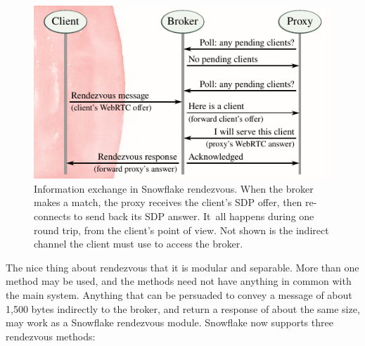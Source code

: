 \documentclass[letterpaper,twocolumn]{article}
\begin{document}
\begin{figure}
\includegraphics{figures/rendezvous/rendezvous}
\caption{
Information exchange in Snowflake rendezvous.
When the broker makes a match,
the proxy receives the client's SDP offer,
then re-connects to send back its SDP answer.
It~all happens during one round trip,
from the client's point of view.
Not shown is the indirect channel
the client must use to access the broker.
}
\label{fig:rendezvous}
\end{figure}

The nice thing about rendezvous that it is modular and separable.
More than one method may be used,
and the methods need not have anything in common with the main system.
Anything that can be persuaded to convey a message
of about 1,500 bytes indirectly to the broker,
and return a response of about the same size,
may work as a Snowflake rendezvous module.
Snowflake now supports three rendezvous methods:
\end{document}
